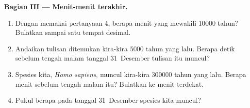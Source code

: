 \begin{problem}
\medskip
\noindent\textbf{Bagian III --- Menit-menit terakhir.}\par\nopagebreak
\begin{enumerate}[resume, beginpenalty=10000]
  \item Dengan memakai pertanyaan 4, berapa menit yang mewakili \num{10000}
        tahun? Bulatkan sampai satu tempat desimal.
  \item Andaikan tulisan ditemukan kira-kira \num{5000} tahun yang lalu.
        Berapa detik sebelum tengah malam tanggal 31~Desember tulisan itu
        muncul?
  \item Spesies kita, \emph{Homo sapiens}, muncul kira-kira \num{300000}
        tahun yang lalu. Berapa menit sebelum tengah malam itu? Bulatkan ke
        menit terdekat.
  \item Pukul berapa pada tanggal 31~Desember spesies kita muncul?
\end{enumerate}
\end{problem}
